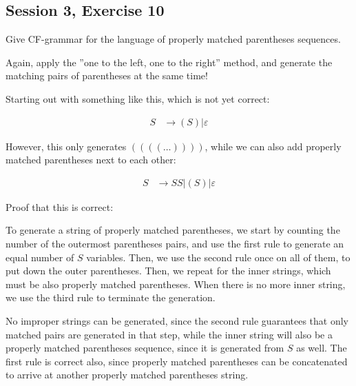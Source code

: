 \subsection{Session 3, Exercise 10}


Give CF-grammar for the language of properly matched parentheses sequences.


Again, apply the ''one to the left, one to the right'' method, and generate the matching pairs of parentheses at the same time!

Starting out with something like this, which is not yet correct:

\begin{align*}
S &\rightarrow (S)|\varepsilon
\end{align*}

However, this only generates $((((\dots))))$, while we can also add properly matched parentheses next to each other:

\begin{align*}
S &\rightarrow SS|(S)|\varepsilon
\end{align*}

Proof that this is correct:

To generate a string of properly matched parentheses, we start by counting the number of the outermost parentheses pairs, and use the first rule to generate an equal number of $S$ variables. Then, we use the second rule once on all of them, to put down the outer parentheses. Then, we repeat for the inner strings, which must be also properly matched parentheses. When there is no more inner string, we use the third rule to terminate the generation.

No improper strings can be generated, since the second rule guarantees that only matched pairs are generated in that step, while the inner string will also be a properly matched parentheses sequence, since it is generated from $S$ as well. The first rule is correct also, since properly matched parentheses can be concatenated to arrive at another properly matched parentheses string.